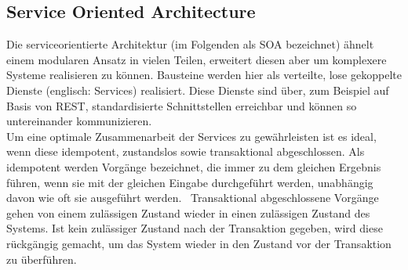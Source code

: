 \subsection{Service Oriented Architecture} %
\label{sec:Service Oriented Architecture}
Die serviceorientierte Architektur (im Folgenden als SOA bezeichnet) ähnelt einem modularen Ansatz in vielen Teilen, erweitert diesen aber um komplexere Systeme realisieren zu können.
Bausteine werden hier als verteilte, lose gekoppelte Dienste (englisch: Services) realisiert.
Diese Dienste sind über, zum Beispiel auf Basis von REST, standardisierte Schnittstellen erreichbar und können so untereinander kommunizieren.\\
Um eine optimale Zusammenarbeit der Services zu gewährleisten ist es ideal, wenn diese idempotent, zustandslos sowie transaktional abgeschlossen.
Als idempotent werden Vorgänge bezeichnet, die immer zu dem gleichen Ergebnis führen, wenn sie mit der gleichen Eingabe durchgeführt werden, unabhängig davon wie oft sie ausgeführt werden.~\cite{softArchGrundl}
Transaktional abgeschlossene Vorgänge gehen von einem zulässigen Zustand wieder in einen zulässigen Zustand des Systems.
Ist kein zulässiger Zustand nach der Transaktion gegeben, wird diese rückgängig gemacht, um das System wieder in den Zustand vor der Transaktion zu überführen.
